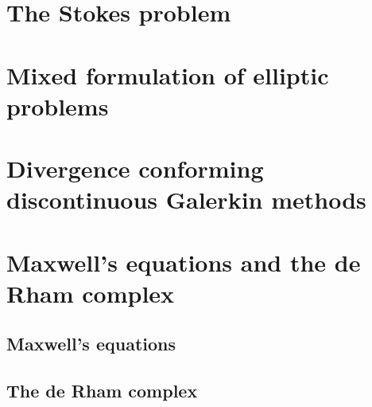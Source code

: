 \chapter{The Stokes problem}
\label{cha:stokes}


\chapter{Mixed formulation of elliptic problems}
\label{cha:darcy}


\chapter{Divergence conforming discontinuous Galerkin methods}
\label{cha:hdivdg}


\chapter{Maxwell's equations and the de Rham complex}
\section{Maxwell's equations}
\label{cha:maxwell}


\section{The de Rham complex}
\label{cha:derham}




\printindex


